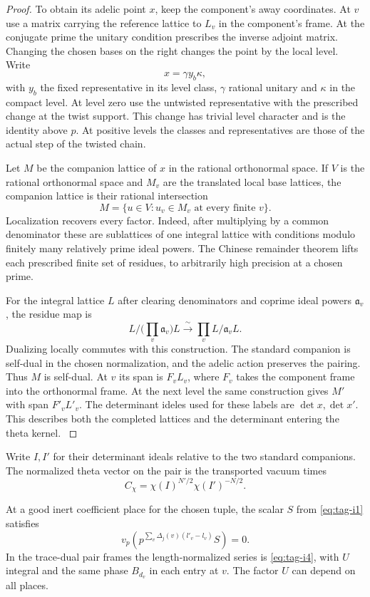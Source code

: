 \begin{proof}
To obtain its adelic point \(x\),
keep the component's away coordinates. At \(v\) use a matrix
carrying the reference lattice to \(L_v\) in the component's frame.
At the conjugate prime the unitary condition prescribes the inverse
adjoint matrix. Changing the chosen bases on the right changes the
point by the local level. Write 
\[
  x=\gamma y_b\kappa,
\]
 with \(y_b\)
the fixed representative in its level class, \(\gamma\) rational
unitary and \(\kappa\) in the compact level. At level zero use the
untwisted representative with the prescribed change at the twist
support. This change has trivial level character and is the identity
above \(p\). At positive levels the classes and representatives are
those of the actual step of the twisted chain.


Let \(M\) be the companion lattice of \(x\) in the rational orthonormal
space. If \(V\) is the rational orthonormal space and \(M_v\) are the translated local base lattices, the companion lattice is their rational intersection
\[
  M=\{u\in V:u_v\in M_v\text{ at every finite }v\}.
\]
 Localization recovers every
factor. Indeed, after multiplying by a common denominator these
are sublattices of one integral lattice with conditions modulo
finitely many relatively prime ideal powers. The Chinese remainder
theorem lifts each prescribed finite set of residues, to arbitrarily
high precision at a chosen prime.

For the integral lattice \(L\) after clearing denominators and coprime ideal powers \(\mathfrak a_v\), the residue map is
\[
  L/\bigl(\prod_v\mathfrak a_v\bigr)L\xrightarrow{\ \sim\ }\prod_v L/\mathfrak a_v L .
\]
 Dualizing locally commutes with
this construction. The standard companion is self-dual in the
chosen normalization, and the adelic action preserves the pairing.
Thus \(M\) is self-dual. At \(v\) its span is \(F_v L_v\), where
\(F_v\) takes the component frame into the orthonormal frame.
At the next level the same construction gives \(M'\) with span
\(F'_v L'_v\). The determinant ideles used for these labels are
\(\det x,\det x'\). This describes both the completed lattices and
the determinant entering the theta kernel. \label{cor:incident-sections-1}

\end{proof}

Write \(I,I'\) for their determinant ideals relative to the two
standard companions. The normalized theta vector on the pair is
the transported vacuum times
\[
 C_\chi=\chi(I)^{N'/2}\chi(I')^{-N/2}.
\]
\begin{proposition}\label{prop:incident-taylor-series}
At a good inert coefficient place for the chosen tuple, the scalar \(S\) from \textup{\eqref{eq:tag-i1}} satisfies
\[
 v_p\!\left(p^{\sum_v\Delta_j(v)(l'_v-l_v)}S\right)=0.
\]
 In the
trace-dual pair frames the length-normalized series is \textup{\eqref{eq:tag-i4}},
with \(U\) integral and the same phase \(B_{d_v}\) in each entry
at \(v\). The factor \(U\) can depend on all places.
\end{proposition}

